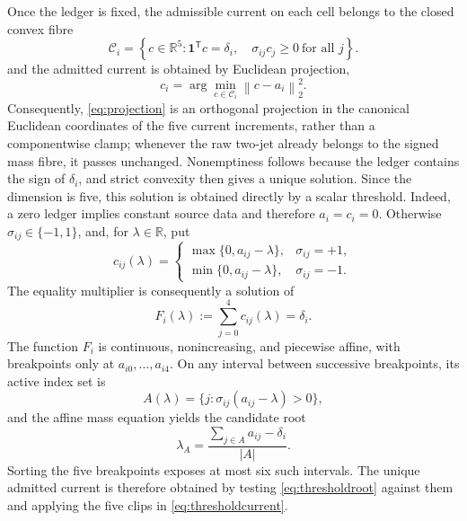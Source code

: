 \documentclass[journal]{IEEEtran}
\newcommand{\R}{\mathbb{R}}
\newcommand{\Ccal}{\mathcal{C}}
\newcommand{\norm}[1]{\left\lVert#1\right\rVert}
\begin{document}
Once the ledger is fixed, the admissible current on each cell belongs to the
closed convex fibre
\begin{equation}
 \Ccal_i=
 \left\{c\in\R^5:
 \bm1^\mathsf Tc=\delta_i,\quad
 \sigma_{ij}c_j\geq0\ \text{for all }j
 \right\}.
 \label{eq:fibre}
\end{equation}
and the admitted current is obtained by Euclidean projection,
\begin{equation}
 c_i=\arg\min_{c\in\Ccal_i}\norm{c-a_i}_2^2.
 \label{eq:projection}
\end{equation}
Consequently, \eqref{eq:projection} is an orthogonal projection in the
canonical Euclidean coordinates of the five current increments, rather than
a componentwise clamp; whenever the raw two-jet already belongs to the signed
mass fibre, it passes unchanged. Nonemptiness follows because the ledger
contains the sign of \(\delta_i\), and strict convexity then gives a unique
solution. Since the dimension is five, this solution is obtained directly by
a scalar threshold. Indeed, a zero ledger implies constant source data and
therefore \(a_i=c_i=0\). Otherwise
\(\sigma_{ij}\in\{-1,1\}\), and, for \(\lambda\in\R\), put
\begin{equation}
 c_{ij}(\lambda)=
 \begin{cases}
 \max\{0,a_{ij}-\lambda\},&\sigma_{ij}=+1,\\
 \min\{0,a_{ij}-\lambda\},&\sigma_{ij}=-1.
 \end{cases}
 \label{eq:thresholdcurrent}
\end{equation}
The equality multiplier is consequently a solution of
\begin{equation}
 F_i(\lambda):=\sum_{j=0}^{4}c_{ij}(\lambda)=\delta_i.
 \label{eq:thresholdmass}
\end{equation}
The function \(F_i\) is continuous, nonincreasing, and piecewise affine,
with breakpoints only at \(a_{i0},\ldots,a_{i4}\). On any interval between
successive breakpoints, its active index set is
\begin{equation}
 A(\lambda)=\{j:\sigma_{ij}(a_{ij}-\lambda)>0\},
\end{equation}
and the affine mass equation yields the candidate root
\begin{equation}
 \lambda_A=\frac{\sum_{j\in A}a_{ij}-\delta_i}{|A|}.
 \label{eq:thresholdroot}
\end{equation}
Sorting the five breakpoints exposes at most six such intervals. The unique
admitted current is therefore obtained by testing
\eqref{eq:thresholdroot} against them and applying the five clips in
\eqref{eq:thresholdcurrent}.
\end{document}
